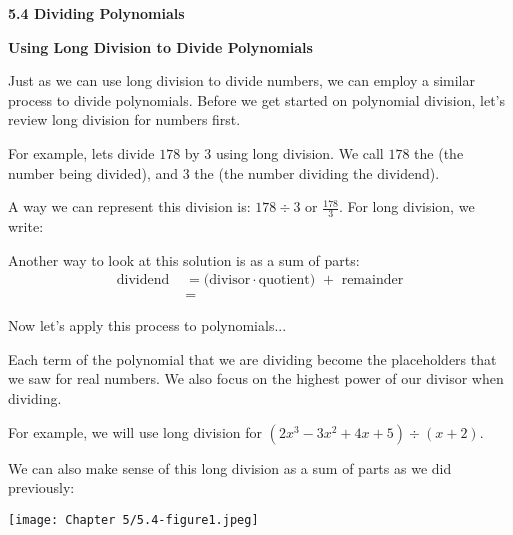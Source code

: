 \documentclass[12pt]{book}
\newcommand{\D}{\displaystyle}
\begin{document}
{\Large \textbf{5.4 Dividing Polynomials}}
\vspace{1mm}

{\large \textbf{Using Long Division to Divide Polynomials}}
\vspace{1mm}

Just as we can use long division to divide numbers, we can employ a similar process to divide polynomials.  Before we get started on polynomial division, let's review long division for numbers first.

\vspace{5mm}

For example, lets divide $178$ by $3$ using long division. We call $178$ the \underline{\hspace{30mm}} (the number being divided), and $3$ the  \underline{\hspace{30mm}} (the number dividing the dividend).

\vspace{5mm}
A way we can represent this division is: $178 \div 3$ or $\D \frac{178}{3}$. For long division, we write: 
\vspace{110mm}

Another way to look at this solution is as a sum of parts: 
\begin{align*}
\text{dividend } &= \text{(divisor}\cdot \text{quotient) } + \text{ remainder} \\
&=   
\end{align*}


\vspace{15mm}

Now let's apply this process to polynomials...

\newpage 

Each term of the polynomial that we are dividing become the placeholders that we saw for real numbers. We also focus on the highest power of our divisor when dividing. 
\vspace{5mm}

For example, we will use long division for $\D (2x^3-3x^2+4x+5) \div (x+2)$. 

\vspace{150mm}

We can also make sense of this long division as a sum of parts as we did previously: 
\vspace{20mm}

\centerline{\texttt{[image: Chapter 5/5.4-figure1.jpeg]}}

\newpage
\end{document}
